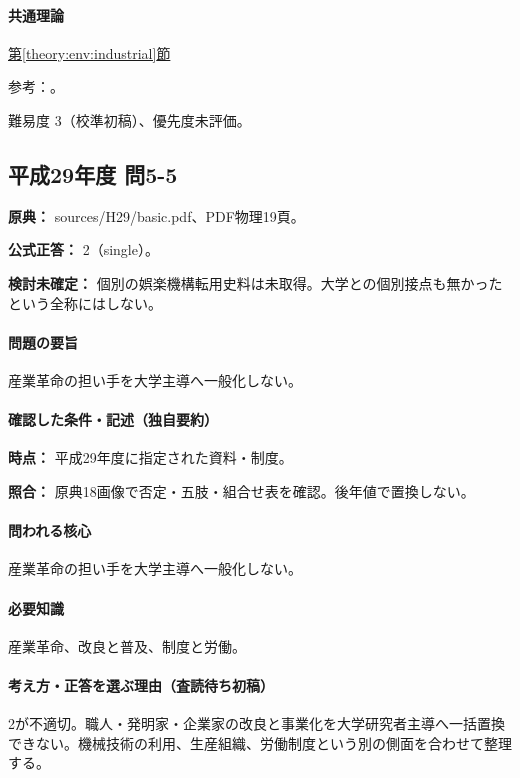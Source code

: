 \paragraph{共通理論} \hyperref[theory:env:industrial]{第\ref*{theory:env:industrial}節}

\par 参考：\cite{env58_steam}。

\par 難易度 3（校準初稿）、優先度未評価。

\subsection{平成29年度 問5-5}
\label{q:h29-reg-basic-5-5}

\noindent\textbf{原典：} sources/H29/basic.pdf、PDF物理19頁。

\textbf{公式正答：} 2（single）。

\par\textbf{検討未確定：} 個別の娯楽機構転用史料は未取得。大学との個別接点も無かったという全称にはしない。

\paragraph{問題の要旨} 産業革命の担い手を大学主導へ一般化しない。

\paragraph{確認した条件・記述（独自要約）}\mbox{}\par

\noindent\textbf{時点：} 平成29年度に指定された資料・制度。\par

\noindent\textbf{照合：} 原典18画像で否定・五肢・組合せ表を確認。後年値で置換しない。\par

\paragraph{問われる核心} 産業革命の担い手を大学主導へ一般化しない。

\paragraph{必要知識} 産業革命、改良と普及、制度と労働。

\paragraph{考え方・正答を選ぶ理由（査読待ち初稿）} 2が不適切。職人・発明家・企業家の改良と事業化を大学研究者主導へ一括置換できない。機械技術の利用、生産組織、労働制度という別の側面を合わせて整理する。


